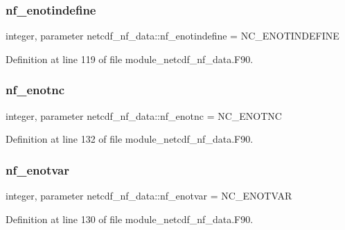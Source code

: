 \subsubsection{\texorpdfstring{nf\+\_\+enotindefine}{nf\_enotindefine}}
{\footnotesize\ttfamily integer, parameter netcdf\+\_\+nf\+\_\+data\+::nf\+\_\+enotindefine = N\+C\+\_\+\+E\+N\+O\+T\+I\+N\+D\+E\+F\+I\+NE}



Definition at line 119 of file module\+\_\+netcdf\+\_\+nf\+\_\+data.\+F90.

\mbox{\label{namespacenetcdf__nf__data_aece9025a7d5d572776bab7fd9a695a96}} 
\subsubsection{\texorpdfstring{nf\+\_\+enotnc}{nf\_enotnc}}
{\footnotesize\ttfamily integer, parameter netcdf\+\_\+nf\+\_\+data\+::nf\+\_\+enotnc = N\+C\+\_\+\+E\+N\+O\+T\+NC}



Definition at line 132 of file module\+\_\+netcdf\+\_\+nf\+\_\+data.\+F90.

\mbox{\label{namespacenetcdf__nf__data_acf95cccfbb55ab7c8dc98567c5f8cf27}} 
\subsubsection{\texorpdfstring{nf\+\_\+enotvar}{nf\_enotvar}}
{\footnotesize\ttfamily integer, parameter netcdf\+\_\+nf\+\_\+data\+::nf\+\_\+enotvar = N\+C\+\_\+\+E\+N\+O\+T\+V\+AR}



Definition at line 130 of file module\+\_\+netcdf\+\_\+nf\+\_\+data.\+F90.

\mbox{\label{namespacenetcdf__nf__data_ab7837c92cf78856dde1888b059c4272c}} 
